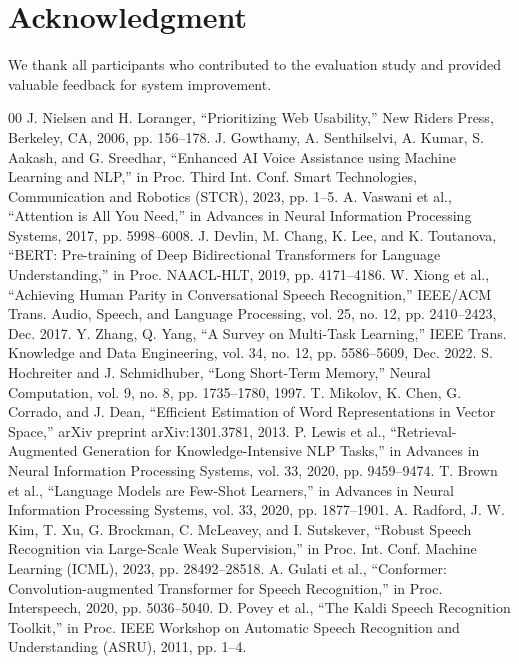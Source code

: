 \documentclass[conference]{IEEEtran}
\begin{document}
\section*{Acknowledgment}

We thank all participants who contributed to the evaluation study and provided valuable feedback for system improvement.

\begin{thebibliography}{00}
 J. Nielsen and H. Loranger, ``Prioritizing Web Usability,'' New Riders Press, Berkeley, CA, 2006, pp. 156--178.
 J. Gowthamy, A. Senthilselvi, A. Kumar, S. Aakash, and G. Sreedhar, ``Enhanced AI Voice Assistance using Machine Learning and NLP,'' in Proc. Third Int. Conf. Smart Technologies, Communication and Robotics (STCR), 2023, pp. 1--5.
 A. Vaswani et al., ``Attention is All You Need,'' in Advances in Neural Information Processing Systems, 2017, pp. 5998--6008.
 J. Devlin, M. Chang, K. Lee, and K. Toutanova, ``BERT: Pre-training of Deep Bidirectional Transformers for Language Understanding,'' in Proc. NAACL-HLT, 2019, pp. 4171--4186.
 W. Xiong et al., ``Achieving Human Parity in Conversational Speech Recognition,'' IEEE/ACM Trans. Audio, Speech, and Language Processing, vol. 25, no. 12, pp. 2410--2423, Dec. 2017.
 Y. Zhang, Q. Yang, ``A Survey on Multi-Task Learning,'' IEEE Trans. Knowledge and Data Engineering, vol. 34, no. 12, pp. 5586--5609, Dec. 2022.
 S. Hochreiter and J. Schmidhuber, ``Long Short-Term Memory,'' Neural Computation, vol. 9, no. 8, pp. 1735--1780, 1997.
 T. Mikolov, K. Chen, G. Corrado, and J. Dean, ``Efficient Estimation of Word Representations in Vector Space,'' arXiv preprint arXiv:1301.3781, 2013.
 P. Lewis et al., ``Retrieval-Augmented Generation for Knowledge-Intensive NLP Tasks,'' in Advances in Neural Information Processing Systems, vol. 33, 2020, pp. 9459--9474.
 T. Brown et al., ``Language Models are Few-Shot Learners,'' in Advances in Neural Information Processing Systems, vol. 33, 2020, pp. 1877--1901.
 A. Radford, J. W. Kim, T. Xu, G. Brockman, C. McLeavey, and I. Sutskever, ``Robust Speech Recognition via Large-Scale Weak Supervision,'' in Proc. Int. Conf. Machine Learning (ICML), 2023, pp. 28492--28518.
 A. Gulati et al., ``Conformer: Convolution-augmented Transformer for Speech Recognition,'' in Proc. Interspeech, 2020, pp. 5036--5040.
 D. Povey et al., ``The Kaldi Speech Recognition Toolkit,'' in Proc. IEEE Workshop on Automatic Speech Recognition and Understanding (ASRU), 2011, pp. 1--4.

\end{thebibliography}
\end{document}
